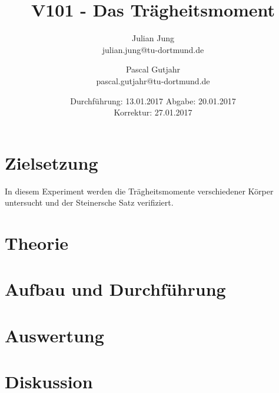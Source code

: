 

\title{V101 - Das Trägheitsmoment}
\author{Julian Jung \\ julian.jung@tu-dortmund.de
  \and Pascal Gutjahr \\ pascal.gutjahr@tu-dortmund.de}
  \date{Durchführung: 13.01.2017
  \hspace{3em}
  Abgabe: 20.01.2017\\
  Korrektur: 27.01.2017}
  
\maketitle
\newpage
\tableofcontents
\newpage
\section{Zielsetzung}
In diesem Experiment werden die Trägheitsmomente verschiedener Körper untersucht
und der Steinersche Satz verifiziert.
\section{Theorie}

\section{Aufbau und Durchführung}

\section{Auswertung}

\section{Diskussion}

\printbibliography


